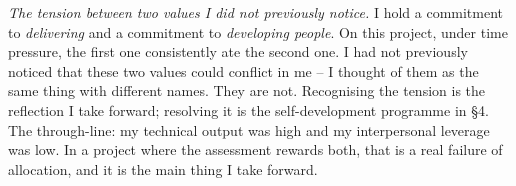 \textit{The tension between two values I did not previously notice.} I hold a commitment to \textit{delivering} and a commitment to \textit{developing people}. On this project, under time pressure, the first one consistently ate the second one. I had not previously noticed that these two values could conflict in me -- I thought of them as the same thing with different names. They are not. Recognising the tension is the reflection I take forward; resolving it is the self-development programme in \S4. The through-line: my technical output was high and my interpersonal leverage was low. In a project where the assessment rewards both, that is a real failure of allocation, and it is the main thing I take forward.
